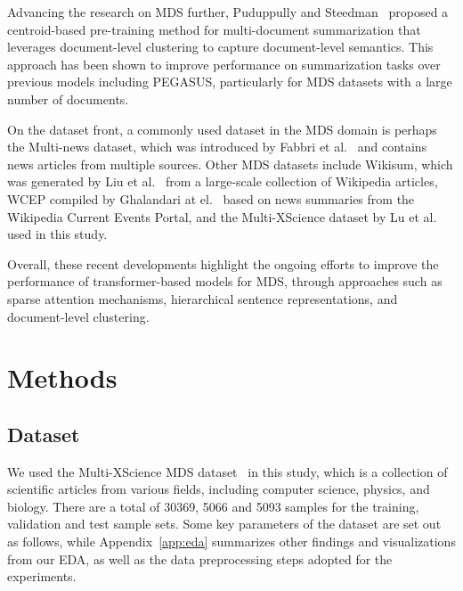 \documentclass[12pt, twocolumn]{article}
\numberwithin{equation}{section}
\begin{document}
Advancing the research on MDS further, Puduppully and Steedman~\cite{puduppully2022multidocument} proposed a centroid-based pre-training method for multi-document summarization that leverages document-level clustering to capture document-level semantics. This approach has been shown to improve performance on summarization tasks over previous models including PEGASUS, particularly for MDS datasets with a large number of documents.

On the dataset front, a commonly used dataset in the MDS domain is perhaps the Multi-news dataset, which was introduced by Fabbri et al.~\cite{fabbri-etal-2019-multi} and contains news articles from multiple sources.  Other MDS datasets include Wikisum, which was generated by Liu et al.~\cite{liu2018generating} from a large-scale collection of Wikipedia articles, WCEP compiled by Ghalandari at el.~\cite{ghalandari2020largescale} based on news summaries from the Wikipedia Current Events Portal, and the Multi-XScience dataset by Lu et al.~\cite{lu-etal-2020-multi-xscience} used in this study.  

Overall, these recent developments highlight the ongoing efforts to improve the performance of transformer-based models for MDS, through approaches such as sparse attention mechanisms, hierarchical sentence representations, and document-level clustering.

\section{Methods}
\label{sec:methods}

\subsection{Dataset}
\label{ssec:dataset}

We used the Multi-XScience MDS dataset~\cite{lu-etal-2020-multi-xscience} in this study, which is a collection of scientific articles from various fields, including computer science, physics, and biology.  There are a total of 30369, 5066 and 5093 samples for the training, validation and test sample sets.  Some key parameters of the dataset are set out as follows, while Appendix~\ref{app:eda} summarizes other findings and visualizations from our EDA, as well as the data preprocessing steps adopted for the experiments.  
\end{document}
